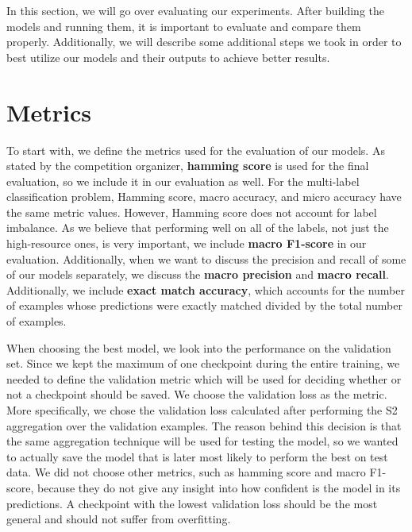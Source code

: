 
In this section, we will go over evaluating our experiments. After building the models and running them, it is important to evaluate and compare them properly. Additionally, we will describe some additional steps we took in order to best utilize our models and their outputs to achieve better results.

\section{Metrics}
\label{sec:metrics}
To start with, we define the metrics used for the evaluation of our models. As stated by the competition organizer, \textbf{hamming score} is used for the final evaluation, so we include it in our evaluation as well. For the multi-label classification problem, Hamming score, macro accuracy, and micro accuracy have the same metric values. However, Hamming score does not account for label imbalance. As we believe that performing well on all of the labels, not just the high-resource ones, is very important, we include \textbf{macro F1-score} in our evaluation. Additionally, when we want to discuss the precision and recall of some of our models separately, we discuss the \textbf{macro precision} and \textbf{macro recall}. Additionally, we include \textbf{exact match accuracy}, which accounts for the number of examples whose predictions were exactly matched divided by the total number of examples. 

When choosing the best model, we look into the performance on the validation set. Since we kept the maximum of one checkpoint during the entire training, we needed to define the validation metric which will be used for deciding whether or not a checkpoint should be saved. We choose the validation loss as the metric. More specifically, we chose the validation loss calculated after performing the S2 aggregation over the validation examples. The reason behind this decision is that the same aggregation technique will be used for testing the model, so we wanted to actually save the model that is later most likely to perform the best on test data. We did not choose other metrics, such as hamming score and macro F1-score, because they do not give any insight into how confident is the model in its predictions. A checkpoint with the lowest validation loss should be the most general and should not suffer from overfitting. 

